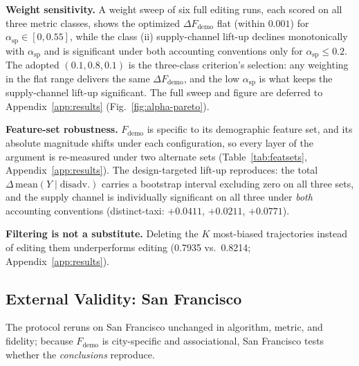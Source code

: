 \textbf{Weight sensitivity.} A weight sweep of six full editing runs, 
each scored on all three metric classes, shows the optimized
$\Delta F_{\mathrm{demo}}$ flat (within $0.001$) for
$\alpha_{\mathrm{sp}} \in [0, 0.55]$, while the class (ii) supply-channel
lift-up declines monotonically with $\alpha_{\mathrm{sp}}$ and is significant
under both accounting conventions only for $\alpha_{\mathrm{sp}} \le 0.2$.
The adopted
$(0.1, 0.8, 0.1)$ is the three-class criterion's selection: any weighting in
the flat range delivers the same $\Delta F_{\mathrm{demo}}$, and the low
$\alpha_{\mathrm{sp}}$ is what keeps the supply-channel lift-up
significant. The full sweep and
figure are deferred to Appendix~\ref{app:results}
(Fig.~\ref{fig:alpha-pareto}).

\textbf{Feature-set robustness.} $F_{\mathrm{demo}}$ is specific to its
demographic feature set, and its absolute magnitude shifts under each 
configuration, so every layer of the argument is re-measured under
two alternate sets (Table~\ref{tab:featsets}, Appendix~\ref{app:results}). The
design-targeted lift-up reproduces: the total
$\Delta\,\mathrm{mean}(Y \mid \mathrm{disadv.})$ carries a bootstrap interval
excluding zero on all three sets, and the supply channel is individually
significant on all three under \emph{both} accounting conventions
(distinct-taxi: $+0.0411$, $+0.0211$, $+0.0771$).

\textbf{Filtering is not a substitute.} Deleting the $K$ most-biased
trajectories instead of editing them underperforms editing (0.7935 vs.\
0.8214; Appendix~\ref{app:results}).

\subsection{External Validity: San Francisco}\label{sec:exp-sf}

The protocol reruns on San Francisco unchanged in algorithm, metric, and
fidelity; because $F_{\mathrm{demo}}$ is city-specific and associational, 
San Francisco tests whether the \emph{conclusions} reproduce.

